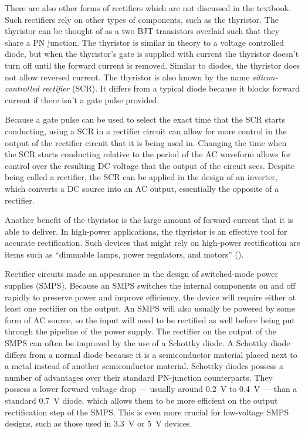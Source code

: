 
There are also other forms of rectifiers which are not
discussed in the textbook. Such rectifiers rely on other
types of components, such as the thyristor. The thyristor
can be thought of as a two BJT transistors overlaid
such that they share a PN junction. The thyristor is
similar in theory to a voltage controlled diode, but
when the thyristor's gate is supplied with current the
thyristor doesn't turn off until the forward current
is removed. Similar to diodes, the thyristor does not
allow reversed current. The thyristor is also known
by the name \emph{silicon-controlled rectifier} (SCR).
It differs from a typical diode because it blocks forward
current if there isn't a gate pulse provided.

Because a gate pulse can be used to select the exact
time that the SCR starts conducting, using a SCR in
a rectifier circuit can allow for more control in the
output of the rectifier circuit that it is being used
in. Changing the time when the SCR starts conducting
relative to the period of the AC waveform allows for
control over the resulting DC voltage that the output
of the circuit sees. Despite being called a rectifier,
the SCR can be applied in the design of an inverter,
which converts a DC source into an AC output, essentially
the opposite of a rectifier.

Another benefit of the thyristor is the large amount
of forward current that it is able to deliver. In high-power
applications, the thyristor is an effective tool for
accurate rectification. Such devices that might rely on
high-power rectification are items such as ``dimmable lamps,
power regulators, and motors'' (\cite{thyristorapplications}). 

Rectifier circuits made an appearance in the design
of switched-mode power supplies (SMPS). Because an SMPS
switches the internal components on and off rapidly
to preserve power and improve efficiency, the device
will require either at least one rectifier on the output.
An SMPS will also usually be powered by some form of
AC source, so the input will need to be rectified as
well before being put through the pipeline of the power
supply. The rectifier on the output of the SMPS can
often be improved by the use of a Schottky diode. A
Schottky diode differs from a normal diode because it
is a semiconductor material placed next to a metal instead
of another semiconductor material. Schottky diodes possess
a number of advantages over their standard PN-junction
counterparts. They possess a lower forward voltage drop
--- usually around 0.2~V to 0.4~V --- than a standard
0.7~V diode, which allows them to be more efficient
on the output rectification step of the SMPS. This is
even more crucial for low-voltage SMPS designs, such
as those used in 3.3~V or 5~V devices.

